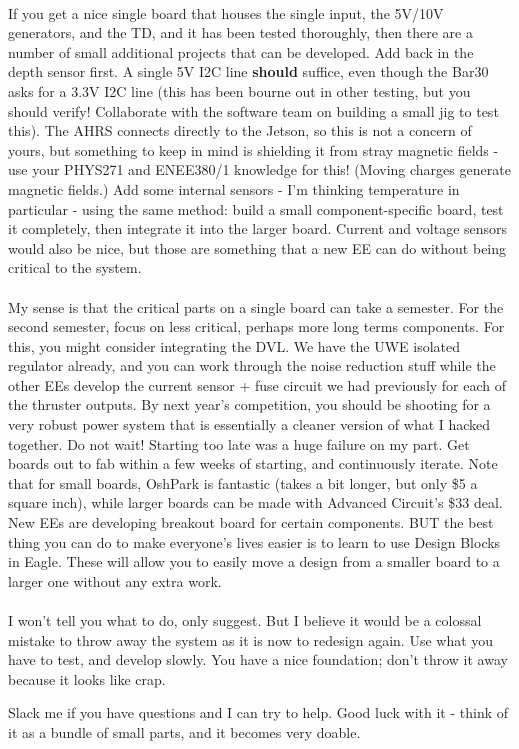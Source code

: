 \documentclass{article}
\begin{document}
\paragraph{}
If you get a nice single board that houses the single input, the 5V/10V generators, and the TD, and it has been tested thoroughly, then there are a number of small additional projects that can be developed. Add back in the depth sensor first. A single 5V I2C line \textbf{should} suffice, even though the Bar30 asks for a 3.3V I2C line (this has been bourne out in other testing, but you should verify! Collaborate with the software team on building a small jig to test this). The AHRS connects directly to the Jetson, so this is not a concern of yours, but something to keep in mind is shielding it from stray magnetic fields - use your PHYS271 and ENEE380/1 knowledge for this! (Moving charges generate magnetic fields.) Add some internal sensors - I'm thinking temperature in particular - using the same method: build a small component-specific board, test it completely, then integrate it into the larger board. Current and voltage sensors would also be nice, but those are something that a new EE can do without being critical to the system. 
\paragraph{}
My sense is that the critical parts on a single board can take a semester. For the second semester, focus on less critical, perhaps more long terms components. For this, you might consider integrating the DVL. We have the UWE isolated regulator already, and you can work through the noise reduction stuff while the other EEs develop the current sensor + fuse circuit we had previously for each of the thruster outputs. By next year's competition, you should be shooting for a very robust power system that is essentially a cleaner version of what I hacked together. Do not wait! Starting too late was a huge failure on my part. Get boards out to fab within a few weeks of starting, and continuously iterate. Note that for small boards, OshPark is fantastic (takes a bit longer, but only \$5 a square inch), while larger boards can be made with Advanced Circuit's \$33 deal. New EEs are developing breakout board for certain components. BUT the best thing you can do to make everyone's lives easier is to learn to use Design Blocks in Eagle. These will allow you to easily move a design from a smaller board to a larger one without any extra work. 
\paragraph{}
I won't tell you what to do, only suggest. But I believe it would be a colossal mistake to throw away the system as it is now to redesign again. Use what you have to test, and develop slowly. You have a nice foundation; don't throw it away because it looks like crap.
\par
Slack me if you have questions and I can try to help. Good luck with it - think of it as a bundle of small parts, and it becomes very doable.
\end{document}
